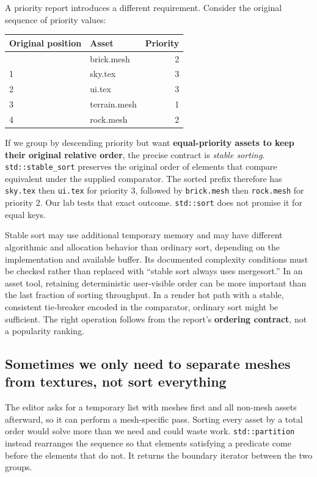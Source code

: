 A priority report introduces a different requirement. Consider the original sequence of priority values:

{\def\LTcaptype{none} %
\begin{longtable}[]{@{}llr@{}}
\toprule\noalign{}
Original position & Asset & Priority \\
\midrule\noalign{}
\endhead
\bottomrule\noalign{}
\endlastfoot
0 & brick.mesh & 2 \\
1 & sky.tex & 3 \\
2 & ui.tex & 3 \\
3 & terrain.mesh & 1 \\
4 & rock.mesh & 2 \\
\end{longtable}
}

If we group by descending priority but want \textbf{equal-priority assets to keep their original relative order}, the precise contract is \emph{stable sorting}. \texttt{std::stable\_sort} preserves the original order of elements that compare equivalent under the supplied comparator. The sorted prefix therefore has \texttt{sky.tex} then \texttt{ui.tex} for priority 3, followed by \texttt{brick.mesh} then \texttt{rock.mesh} for priority 2. Our lab tests that exact outcome. \texttt{std::sort} does not promise it for equal keys.

Stable sort may use additional temporary memory and may have different algorithmic and allocation behavior than ordinary sort, depending on the implementation and available buffer. Its documented complexity conditions must be checked rather than replaced with ``stable sort always uses mergesort.'' In an asset tool, retaining deterministic user-visible order can be more important than the last fraction of sorting throughput. In a render hot path with a stable, consistent tie-breaker encoded in the comparator, ordinary sort might be sufficient. The right operation follows from the report's \textbf{ordering contract}, not a popularity ranking.

\subsection{Sometimes we only need to separate meshes from textures, not sort everything}\label{05-engine-i-ch006-sometimes-we-only-need-to-separate-meshes-from-textures-not-sort-everything}

The editor asks for a temporary list with meshes first and all non-mesh assets afterward, so it can perform a mesh-specific pass. Sorting every asset by a total order would solve more than we need and could waste work. \texttt{std::partition} instead rearranges the sequence so that elements satisfying a predicate come before the elements that do not. It returns the boundary iterator between the two groups.

